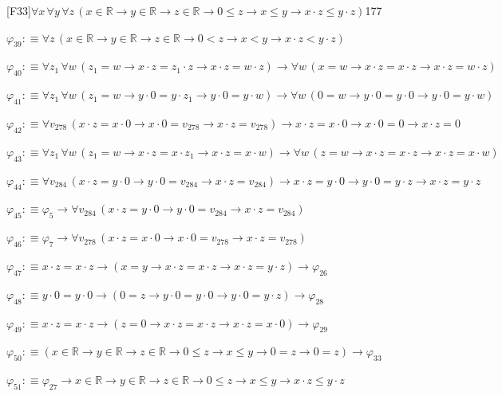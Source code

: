 \begin{fullproof}{[F33]}{$\forall x\,\forall y\,\forall z\,(x \in \mathbb{R} \to y \in \mathbb{R} \to z \in \mathbb{R} \to 0 \leq z \to x \leq y \to x \cdot z \leq y \cdot z)$}{177}
\begin{abbrevlist}
\item $\varphi_{39} :\equiv \forall z\,(x \in \mathbb{R} \to y \in \mathbb{R} \to z \in \mathbb{R} \to 0 < z \to x < y \to x \cdot z < y \cdot z)$
\item $\varphi_{40} :\equiv \forall z_{1}\,\forall w\,(z_{1} = w \to x \cdot z = z_{1} \cdot z \to x \cdot z = w \cdot z) \to \forall w\,(x = w \to x \cdot z = x \cdot z \to x \cdot z = w \cdot z)$
\item $\varphi_{41} :\equiv \forall z_{1}\,\forall w\,(z_{1} = w \to y \cdot 0 = y \cdot z_{1} \to y \cdot 0 = y \cdot w) \to \forall w\,(0 = w \to y \cdot 0 = y \cdot 0 \to y \cdot 0 = y \cdot w)$
\item $\varphi_{42} :\equiv \forall v_{278}\,(x \cdot z = x \cdot 0 \to x \cdot 0 = v_{278} \to x \cdot z = v_{278}) \to x \cdot z = x \cdot 0 \to x \cdot 0 = 0 \to x \cdot z = 0$
\item $\varphi_{43} :\equiv \forall z_{1}\,\forall w\,(z_{1} = w \to x \cdot z = x \cdot z_{1} \to x \cdot z = x \cdot w) \to \forall w\,(z = w \to x \cdot z = x \cdot z \to x \cdot z = x \cdot w)$
\item $\varphi_{44} :\equiv \forall v_{284}\,(x \cdot z = y \cdot 0 \to y \cdot 0 = v_{284} \to x \cdot z = v_{284}) \to x \cdot z = y \cdot 0 \to y \cdot 0 = y \cdot z \to x \cdot z = y \cdot z$
\item $\varphi_{45} :\equiv \varphi_{5} \to \forall v_{284}\,(x \cdot z = y \cdot 0 \to y \cdot 0 = v_{284} \to x \cdot z = v_{284})$
\item $\varphi_{46} :\equiv \varphi_{7} \to \forall v_{278}\,(x \cdot z = x \cdot 0 \to x \cdot 0 = v_{278} \to x \cdot z = v_{278})$
\item $\varphi_{47} :\equiv x \cdot z = x \cdot z \to (x = y \to x \cdot z = x \cdot z \to x \cdot z = y \cdot z) \to \varphi_{26}$
\item $\varphi_{48} :\equiv y \cdot 0 = y \cdot 0 \to (0 = z \to y \cdot 0 = y \cdot 0 \to y \cdot 0 = y \cdot z) \to \varphi_{28}$
\item $\varphi_{49} :\equiv x \cdot z = x \cdot z \to (z = 0 \to x \cdot z = x \cdot z \to x \cdot z = x \cdot 0) \to \varphi_{29}$
\item $\varphi_{50} :\equiv (x \in \mathbb{R} \to y \in \mathbb{R} \to z \in \mathbb{R} \to 0 \leq z \to x \leq y \to 0 = z \to 0 = z) \to \varphi_{33}$
\item $\varphi_{51} :\equiv \varphi_{27} \to x \in \mathbb{R} \to y \in \mathbb{R} \to z \in \mathbb{R} \to 0 \leq z \to x \leq y \to x \cdot z \leq y \cdot z$

\end{abbrevlist}
\end{fullproof}
